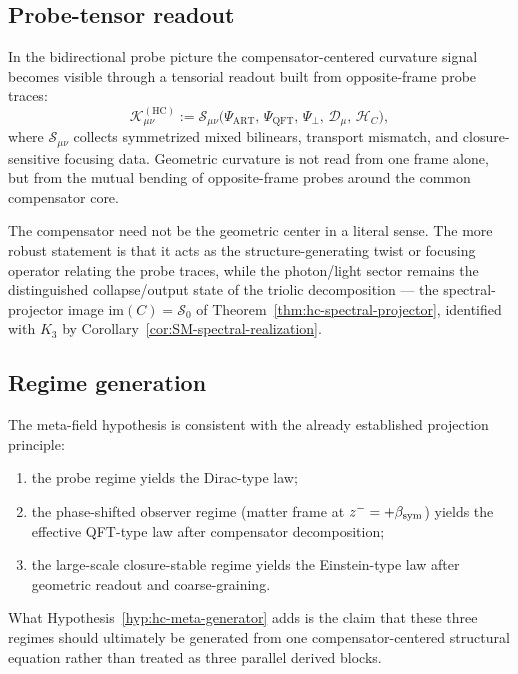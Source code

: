 \subsection*{Probe-tensor readout}

In the bidirectional probe picture the compensator-centered curvature
signal becomes visible through a tensorial readout built from
opposite-frame probe traces:
\[
  \mathcal{K}_{\mu\nu}^{(\mathrm{HC})}
  :=
  \mathcal{S}_{\mu\nu}
  \bigl(
    \Psi_{\mathrm{ART}},\,
    \Psi_{\mathrm{QFT}},\,
    \Psi_\perp,\,
    \mathcal{D}_\mu,\,
    \mathcal{H}_C
  \bigr),
\]
where $\mathcal{S}_{\mu\nu}$ collects symmetrized mixed bilinears,
transport mismatch, and closure-sensitive focusing data.
Geometric curvature is not read from one frame alone, but from the
mutual bending of opposite-frame probes around the common compensator
core.

\begin{remark}
The compensator need not be the geometric center in a literal sense.
The more robust statement is that it acts as the structure-generating
twist or focusing operator relating the probe traces, while the
photon/light sector remains the distinguished collapse/output state of
the triolic decomposition --- the spectral-projector image
$\mathrm{im}(C) = \mathcal{S}_0$ of Theorem~\ref{thm:hc-spectral-projector},
identified with $K_3$ by Corollary~\ref{cor:SM-spectral-realization}.
\end{remark}

\subsection*{Regime generation}

The meta-field hypothesis is consistent with the already established
projection principle:
\begin{enumerate}[label=(\arabic*)]
  \item the probe regime yields the Dirac-type law;
  \item the phase-shifted observer regime (matter frame at
        $z^- = +\beta_{\mathrm{sym}}$) yields the effective QFT-type law after
        compensator decomposition;
  \item the large-scale closure-stable regime yields the Einstein-type
        law after geometric readout and coarse-graining.
\end{enumerate}
What Hypothesis~\ref{hyp:hc-meta-generator} adds is the claim that
these three regimes should ultimately be generated from one
compensator-centered structural equation rather than treated as three
parallel derived blocks.

